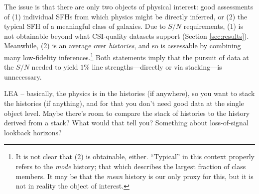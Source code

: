 \documentclass[a4paper,fleqn,usenatbib]{mnras}
\newcommand{\bfr}{\bf\color{red}}
\newcommand{\bfb}{\color{myblue}}
\begin{document}
The issue is that there are only two objects of physical interest: good assessments of (1) individual SFHs 
from which physics might be directly inferred, or  (2) the typical SFH of a meaningful class of galaxies. 
Due to $S/N$ requirements, (1) is not obtainable beyond what CSI-quality datasets support (Section
\ref{sec:results}). Meanwhile, (2) is an average over {\it histories}, and so is assessable by combining many 
low-fidelity inferences.\footnote{It is
not clear that (2) is obtainable, either. ``Typical'' in this context properly refers to the {\it mode} history; 
that which describes the largest fraction of class members. It may be that the {\it mean} history is our 
only proxy for this, but it is not in reality the object of interest.} Both statements imply that the 
pursuit of data at the $S/N$ needed to yield $1\%$ line strengths---directly or via stacking---is unnecessary. %


{\bfb LEA -- basically,
the physics is in the histories (if anywhere), so you want to stack the histories (if anything), and 
for that you don't need good data at the single object level. Maybe there's room to compare
the stack of histories to the history derived from a stack? What would that tell you? Something
about loss-of-signal lookback horizons?}



\end{document}
